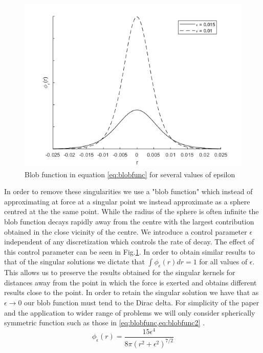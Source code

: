 \begin{figure}
    \centering
    \includegraphics[scale=0.65]{Images/BlobFunction.png}
    \caption{Blob function in equation \cref{eq:blobfunc} for several values of epsilon}
    \label{fig:blobfunc}
\end{figure}

In order to remove these singularities we use a "blob function" which instead of approximating at force at a singular point we instead approximate as a sphere centred at the the same point. While the radius of the sphere is often infinite the blob function decays rapidly away from the centre with the largest contribution obtained in the close vicinity of the centre. We introduce a control parameter $\epsilon$ independent of any discretization which controls the rate of decay. The effect of this control parameter can be seen in Fig.\ref{fig:blobfunc}. In order to obtain similar results to that of the singular solutions we dictate that $\int \phi_\epsilon(r)dr=1$ for all values of $\epsilon$. This allows us to preserve the results obtained for the singular kernels for distances away from the point in which the force is exerted and obtains different results close to the point. In order to retain the singular solution we have that as $\epsilon \to 0$ our blob function must tend to the Dirac delta. For simplicity of the paper and the application to wider range of problems we will only consider spherically symmetric function such as those in \cref{eq:blobfunc,eq:blobfunc2} \cite{Cortez2005,Olson2013ModelingFormulation,Nguyen2014ReductionFlow}.
\begin{equation}
\label{eq:blobfunc}
    \phi_\epsilon(r)= \frac{15 \epsilon^4}{8\pi\left( r^2 +\epsilon^2 \right)^{7/2}}
\end{equation}

